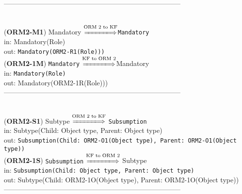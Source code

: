 \documentclass[sn-mathphys]{sn-jnl}
\begin{document}
{{{{------------------------------------------------------------------------------
\\ \

({\bf ORM2-M1}) Mandatory $\overset{\text{ORM 2 to KF}}{\xLongrightarrow{\hspace*{1.4cm}}}${\tt Mandatory}\\
\hspace*{0.3cm}in: Mandatory(Role)\\
\hspace*{0.5cm}out: {\tt Mandatory(ORM2-R1(Role)))}\\

({\bf ORM2-1M}) {\tt Mandatory} $\overset{\text{KF to ORM 2}}{\xLongrightarrow{\hspace*{1.4cm}}}${Mandatory}\\
\hspace*{0.3cm}in: {\tt Mandatory(Role)}\\
\hspace*{0.5cm}out: {Mandatory(ORM2-1R(Role)))}\\

------------------------------------------------------------------------------
\\ \

({\bf ORM2-S1}) {Subtype} $\overset{\text{ORM 2 to KF}}{\xLongrightarrow{\hspace*{1.4cm}}}$ {\tt Subsumption}\\
\hspace*{0.3cm}in: {Subtype(Child: Object type, Parent: Object type)} \\
\hspace*{0.5cm}out:  {\tt Subsumption(Child: ORM2-O1(Object type), Parent: ORM2-O1(Object type))}\\


({\bf ORM2-1S}) {\tt Subsumption} $\overset{\text{KF to ORM 2}}{\xLongrightarrow{\hspace*{1.4cm}}}$ {Subtype}\\
\hspace*{0.3cm}in: {\tt Subsumption(Child: Object type, Parent: Object type)} \\
\hspace*{0.5cm}out:  {Subtype(Child: ORM2-1O(Object type), Parent: ORM2-1O(Object type))}\\
 
------------------------------------------------------------------------------
\\ \

}}}}
\end{document}
